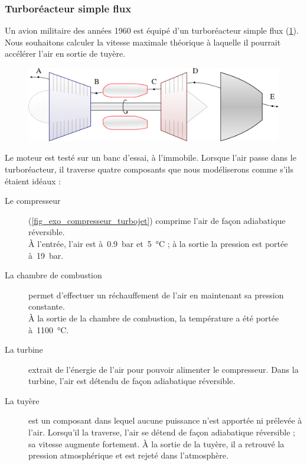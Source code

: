 \subsubsection{Turboréacteur simple flux}
\label{exo_turboreacteur_simple_flux}

	Un avion militaire des années 1960 est équipé d’un turboréacteur simple flux (\cref{fig_exo_turbojet}). Nous souhaitons calculer la vitesse maximale théorique à laquelle il pourrait accélérer l’air en sortie de tuyère.
	
	\begin{figure}
		\begin{center}
			\includegraphics[width=\textwidth]{images/turbojet.png}
		\end{center}
		\label{fig_exo_turbojet}
	\end{figure}
	
	Le moteur est testé sur un banc d’essai, à l’immobile. Lorsque l’air passe dans le turboréacteur, il traverse quatre composants que nous modéliserons comme s’ils étaient idéaux :
	
	\begin{description}
		\item [Le compresseur] (\cref{fig_exo_compresseur_turbojet}) comprime l’air de façon adiabatique réversible.\\
			À l’entrée, l’air est à~\SI{0,9}{\bar} et~\SI{5}{\degreeCelsius} ; à la sortie la pression est portée à~\SI{19}{\bar}. 
		\item [La chambre de combustion] permet d’effectuer un réchauffement de l’air en maintenant sa pression constante.\\
			À la sortie de la chambre de combustion, la température a été portée à~\SI{1100}{\degreeCelsius}.
		\item [La turbine] extrait de l’énergie de l’air pour pouvoir alimenter le compresseur. Dans la turbine, l’air est détendu de façon adiabatique réversible.
		\item [La tuyère] est un composant dans lequel aucune puissance n’est apportée ni prélevée à l’air. Lorsqu’il la traverse, l’air se détend de façon adiabatique réversible ; sa vitesse augmente fortement. À la sortie de la tuyère, il a retrouvé la pression atmosphérique et est rejeté dans l’atmosphère.
	\end{description}
	
